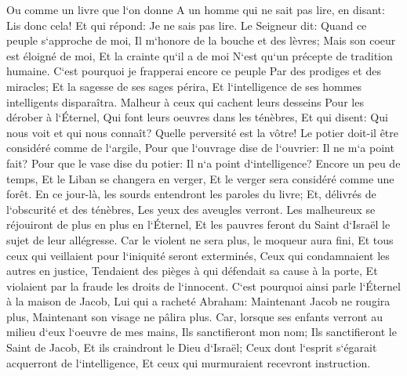 \verse Ou comme un livre que l`on donne A un homme qui ne sait pas lire, en disant: Lis donc cela! Et qui répond: Je ne sais pas lire. 
\verse Le Seigneur dit: Quand ce peuple s`approche de moi, Il m`honore de la bouche et des lèvres; Mais son coeur est éloigné de moi, Et la crainte qu`il a de moi N`est qu`un précepte de tradition humaine. 
\verse C`est pourquoi je frapperai encore ce peuple Par des prodiges et des miracles; Et la sagesse de ses sages périra, Et l`intelligence de ses hommes intelligents disparaîtra. 
\verse Malheur à ceux qui cachent leurs desseins Pour les dérober à l`Éternel, Qui font leurs oeuvres dans les ténèbres, Et qui disent: Qui nous voit et qui nous connaît? 
\verse Quelle perversité est la vôtre! Le potier doit-il être considéré comme de l`argile, Pour que l`ouvrage dise de l`ouvrier: Il ne m`a point fait? Pour que le vase dise du potier: Il n`a point d`intelligence? 
\verse Encore un peu de temps, Et le Liban se changera en verger, Et le verger sera considéré comme une forêt. 
\verse En ce jour-là, les sourds entendront les paroles du livre; Et, délivrés de l`obscurité et des ténèbres, Les yeux des aveugles verront. 
\verse Les malheureux se réjouiront de plus en plus en l`Éternel, Et les pauvres feront du Saint d`Israël le sujet de leur allégresse. 
\verse Car le violent ne sera plus, le moqueur aura fini, Et tous ceux qui veillaient pour l`iniquité seront exterminés, 
\verse Ceux qui condamnaient les autres en justice, Tendaient des pièges à qui défendait sa cause à la porte, Et violaient par la fraude les droits de l`innocent. 
\verse C`est pourquoi ainsi parle l`Éternel à la maison de Jacob, Lui qui a racheté Abraham: Maintenant Jacob ne rougira plus, Maintenant son visage ne pâlira plus. 
\verse Car, lorsque ses enfants verront au milieu d`eux l`oeuvre de mes mains, Ils sanctifieront mon nom; Ils sanctifieront le Saint de Jacob, Et ils craindront le Dieu d`Israël; 
\verse Ceux dont l`esprit s`égarait acquerront de l`intelligence, Et ceux qui murmuraient recevront instruction. 

